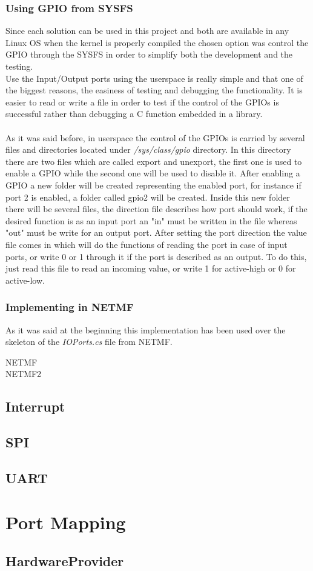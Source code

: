 \subsubsection{Using GPIO from SYSFS}\label{SSS:GPIO-SYSFS}
Since each solution can be used in this project and both are available in any Linux OS when the kernel is properly compiled the chosen option was control the GPIO through the SYSFS in order to simplify both the development and the testing.
\\
Use the Input/Output ports using the userspace is really simple and that one of the biggest reasons, the easiness of testing and debugging the functionality. It is easier to read or write a file in order to test if the control of the GPIOs is successful rather than debugging a C function embedded in a library.
\\
\\
As it was said before, in userspace the control of the GPIOs is carried by several files and directories located under \textit{/sys/class/gpio} directory. In this directory there are two files which are called export and unexport, the first one is used to enable a GPIO while the second one will be used to disable it. After enabling a GPIO a new folder will be created representing the enabled port, for instance if port 2 is enabled, a folder called gpio2 will be created. Inside this new folder there will be several files, the direction file describes how port should work, if the desired function is as an input port an "in" must be written in the file whereas "out" must be write for an output port. After setting the port direction the value file comes in which will do the functions of reading the port in case of input ports, or write 0 or 1 through it if the port is described as an output. To do this, just read this file to read an incoming value, or write 1 for active-high or 0 for active-low.

\subsubsection{Implementing in NETMF}\label{SSS:Implementing-GPIO-NETMF}
As it was said at the beginning this implementation has been used over the skeleton of the \textit{IOPorts.cs} file from NETMF.

\gls{NETMF}\\
\gls{NETMF2}


\subsection{Interrupt}\label{SS:RaspberryPi-NETMF}
\subsection{SPI}\label{SS:RaspberryPi-NETMF}
\subsection{UART}\label{SS:RaspberryPi-NETMF}


\section{Port Mapping}\label{S:Port-Mapping}
\subsection{HardwareProvider}\label{SS:HardwareProvider}



